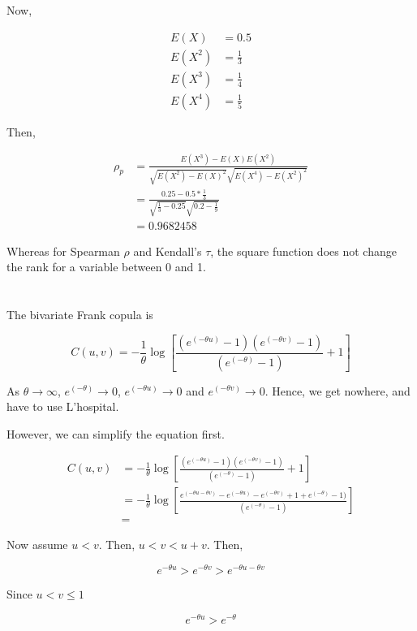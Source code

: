 \documentclass[11pt]{scrartcl}
\begin{document}
Now,

\begin{align*}
E(X) &= 0.5 \\
E(X^2) &= \frac{1}{3} \\
E(X^3) &= \frac{1}{4} \\
E(X^4) &= \frac{1}{5}
\end{align*}

Then,

\begin{align*}
\rho_p &= \frac{E(X^3) - E(X)E(X^2)}{\sqrt{E(X^2) - E(X)^2}\sqrt{E(X^4)-E(X^2)^2}} \\
&= \frac{0.25 - 0.5*\frac{1}{3}}{\sqrt{\frac{1}{3} - 0.25}\sqrt{0.2-\frac{1}{9}}} \\
&= 0.9682458
\end{align*}

Whereas for Spearman $\rho$ and Kendall's $\tau$, the square function does not change the rank for a variable between 0 and 1.

\section{}

The bivariate Frank copula is 

\[C(u,v) = -\frac{1}{\theta} \log{\left[\frac{(e^{(-\theta u)} - 1)(e^{(-\theta v)} - 1)}{(e^{(-\theta)} - 1)} + 1\right]}\]

As $\theta \to \infty$, $e^{(-\theta)} \to 0$, $e^{(-\theta u)} \to 0$ and $e^{(-\theta v)} \to 0$. Hence, we get nowhere, and have to use L'hospital.

However, we can simplify the equation first.

\begin{align*}
C(u,v) &= -\frac{1}{\theta} \log{\left[\frac{(e^{(-\theta u)} - 1)(e^{(-\theta v)} - 1)}{(e^{(-\theta)} - 1)} + 1\right]} \\
&= -\frac{1}{\theta} \log{\left[\frac{e^{(-\theta u -\theta v)} - e^{(-\theta u)} - e^{(-\theta v)} + 1 + e^{(-\theta)} - 1)}{(e^{(-\theta)} - 1)}\right]} \\
&= 
\end{align*}

Now assume $u < v$. Then, $u < v < u + v$. Then,

\[e^{-\theta u} > e^{-\theta v} > e^{-\theta u - \theta v}\]

Since $u < v \leq 1$

\[e^{-\theta u} > e^{-\theta}\]
\end{document}
